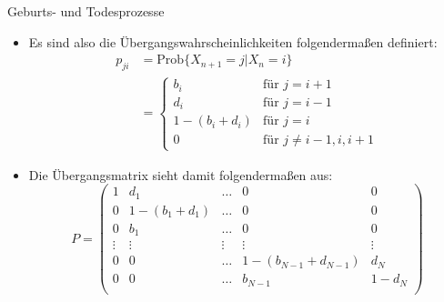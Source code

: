 \documentclass{beamer}
\begin{document}
\begin{frame}{Geburts- und Todesprozesse}
  \begin{itemize}
  \item Es sind also die Übergangswahrscheinlichkeiten folgendermaßen definiert:
    \begin{align*}
  p_{ji} &= \text{Prob}\{X_{n+1} = j | X_n = i\} \\
         &= \begin{cases}
           b_i &\text{für } j = i+1 \\
           d_i &\text{für } j = i-1 \\
           1 - (b_i+d_i) &\text{für } j = i \\
           0 &\text{für } j \neq i-1,i,i+1
         \end{cases}
    \end{align*}
  \item  Die Übergangsmatrix sieht damit folgendermaßen aus:
    \[
      P = \begin{pmatrix}
        1 & d_1 & \dots & 0 & 0 \\
        0 & 1 - (b_1 + d_1) &  \dots & 0 & 0 \\
        0 & b_1 & \dots & 0 & 0 \\
        \vdots & \vdots & \vdots & \vdots & \vdots \\
        0 & 0  &  \dots & 1 - (b_{N-1} + d_{N-1}) & d_N \\
        0 & 0  &  \dots & b_{N-1} & 1 - d_N \\
      \end{pmatrix}
    \]
  \end{itemize}
\end{frame}
\end{document}
